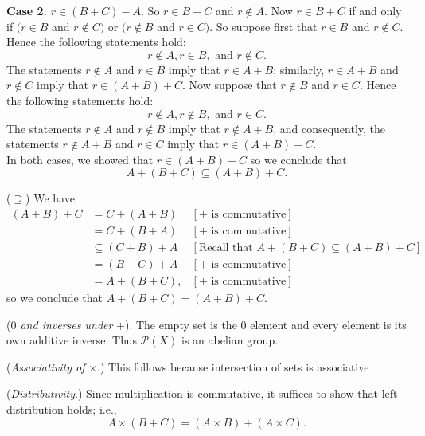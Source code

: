 \begin{enumerate}
\begin{enumerate}
               \textbf{Case 2.} $r \in (B + C) - A$. So $r \in B + C$ and
               $r \notin A$. Now $r \in B + C$ if and only if
               $(r \in B$ and $r \notin C)$ or $(r \notin B$ and $r \in C)$. So
               suppose first that $r \in B$ and $r \notin C$. Hence the
               following statements hold:
               $$r \notin A, r \in B, \text{ and }r \notin C.$$
               The statements $r \notin A$ and $r \in B$ imply that
               $r \in A + B$; similarly, $r \in A + B$ and $r \notin C$ imply 
               that $r \in (A + B) + C$. Now suppose that
               $r \notin B$ and $r \in C$. Hence the
               following statements hold:
               $$r \notin A, r \notin B, \text{ and }r \in C.$$
               The statements $r \notin A$ and $r \notin B$ imply that
               $r \notin A + B$, and consequently, the statements 
               $r \notin A + B$ and $r \in C$ imply that $r \in (A + B) + C$. \\

               In both cases, we showed that $r \in (A + B) + C$ so
               we conclude that $$A + (B + C) \subseteq (A + B) + C.$$

               ($\supseteq$) We have
               \begin{align*}
                  (A + B) + C &= C + (A + B) &[\text{+ is commutative}] \\
                     &= C + (B + A) &[\text{+ is commutative}] \\
                     &\subseteq (C + B) + A &[\text{Recall that }
                     A + (B + C) \subseteq (A + B) + C] \\
                     &= (B + C) + A &[\text{+ is commutative}] \\
                     &= A + (B + C), &[\text{+ is commutative}]
               \end{align*}
               so we conclude that $A + (B + C) = (A + B) + C$.

               (\textit{$0$ and inverses under }+). The empty set is the
               0 element and every element is its own additive inverse. Thus
               $\mathcal{P}(X)$ is an abelian group.

               (\textit{Associativity of }$\times$.) This follows because 
               intersection of sets is associative

               (\textit{Distributivity}.) Since multiplication is commutative,
               it suffices to show that left distribution holds; i.e.,
               $$A \times (B + C) = (A \times B) + (A \times C).$$


\end{enumerate}
\end{enumerate}
